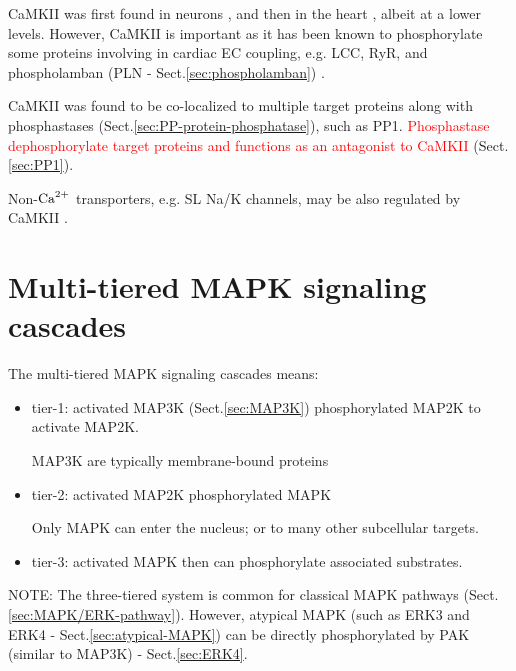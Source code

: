 CaMKII was first found in neurons \citep{kennedy1981}, and then in the heart
\citep{jett1987}, albeit at a lower levels.  However, CaMKII is important as it
has been known to phosphorylate some proteins involving in cardiac EC coupling,
e.g. LCC, RyR, and phospholamban (PLN - Sect.\ref{sec:phospholamban})
\citep{maier2002, hook2001}. 

CaMKII was found to be co-localized to multiple target proteins along with
phosphastases (Sect.\ref{sec:PP-protein-phosphatase}), such as PP1.
\textcolor{red}{Phosphastase dephosphorylate target proteins and functions as an
antagonist to CaMKII} (Sect.\ref{sec:PP1}). 

Non-${\text{Ca}^{2+}}$ transporters, e.g. SL Na/K channels, may be also regulated by CaMKII
\citep{maier2007}.

% 

\section{Multi-tiered MAPK signaling cascades}
\label{sec:multi-tiered-MAPK-cascades}
\label{sec:MAPK-multi-tiered-cascades}

The multi-tiered MAPK signaling cascades means:
\begin{itemize}
  \item tier-1: activated MAP3K (Sect.\ref{sec:MAP3K}) phosphorylated MAP2K to activate MAP2K.
  
MAP3K are typically membrane-bound proteins

  \item tier-2: activated MAP2K phosphorylated MAPK
  
Only MAPK can enter the  nucleus; or to many other subcellular targets. 

  \item tier-3: activated MAPK then can phosphorylate associated substrates. 
\end{itemize}

NOTE: The three-tiered system is common for classical MAPK pathways
(Sect.\ref{sec:MAPK/ERK-pathway}). However, atypical MAPK (such as ERK3 and
ERK4 - Sect.\ref{sec:atypical-MAPK}) can be directly phosphorylated by PAK
(similar to MAP3K) - Sect.\ref{sec:ERK4}.

